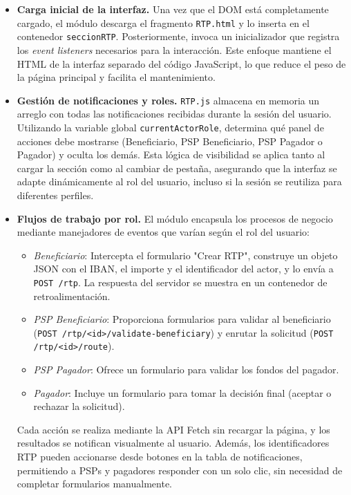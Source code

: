 \begin{itemize}
        \begin{itemize}
            \item \textbf{Carga inicial de la interfaz.} Una vez que el DOM está completamente cargado, el módulo descarga el fragmento \texttt{RTP.html} y lo inserta en el contenedor \texttt{seccionRTP}. Posteriormente, invoca un inicializador que registra los \textit{event listeners} necesarios para la interacción. Este enfoque mantiene el HTML de la interfaz separado del código JavaScript, lo que reduce el peso de la página principal y facilita el mantenimiento.

            \item \textbf{Gestión de notificaciones y roles.} \texttt{RTP.js} almacena en memoria un arreglo con todas las notificaciones recibidas durante la sesión del usuario. Utilizando la variable global \texttt{currentActorRole}, determina qué panel de acciones debe mostrarse (Beneficiario, PSP Beneficiario, PSP Pagador o Pagador) y oculta los demás. Esta lógica de visibilidad se aplica tanto al cargar la sección como al cambiar de pestaña, asegurando que la interfaz se adapte dinámicamente al rol del usuario, incluso si la sesión se reutiliza para diferentes perfiles.

            \item \textbf{Flujos de trabajo por rol.} El módulo encapsula los procesos de negocio mediante manejadores de eventos que varían según el rol del usuario:
            \begin{itemize}
                \item \textit{Beneficiario}: Intercepta el formulario "Crear RTP", construye un objeto JSON con el IBAN, el importe y el identificador del actor, y lo envía a \texttt{POST /rtp}. La respuesta del servidor se muestra en un contenedor de retroalimentación.
                \item \textit{PSP Beneficiario}: Proporciona formularios para validar al beneficiario (\texttt{POST /rtp/<id>/validate-beneficiary}) y enrutar la solicitud (\texttt{POST /rtp/<id>/route}).
                \item \textit{PSP Pagador}: Ofrece un formulario para validar los fondos del pagador.
                \item \textit{Pagador}: Incluye un formulario para tomar la decisión final (aceptar o rechazar la solicitud).
            \end{itemize}
            Cada acción se realiza mediante la API Fetch sin recargar la página, y los resultados se notifican visualmente al usuario. Además, los identificadores RTP pueden accionarse desde botones en la tabla de notificaciones, permitiendo a PSPs y pagadores responder con un solo clic, sin necesidad de completar formularios manualmente.


\end{itemize}
\end{itemize}
